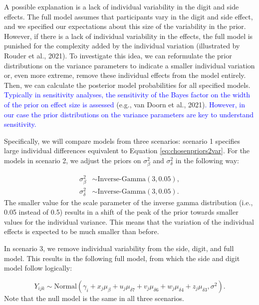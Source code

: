 \documentclass[
  english,
  doc,floatsintext]{apa6}
\begin{document}
A possible explanation is a lack of individual variability in the digit and side effects. The full model assumes that participants vary in the digit and side effect, and we specified our expectations about this size of the variability in the prior. However, if there is a lack of individual variability in the effects, the full model is punished for the complexity added by the individual variation (illustrated by Rouder et al., 2021). To investigate this idea, we can reformulate the prior distributions on the variance parameters to indicate a smaller individual variation or, even more extreme, remove these individual effects from the model entirely. Then, we can calculate the posterior model probabilities for all specified models. \textcolor{blue}{Typically in sensitivity analyses, the sensitivity of the Bayes factor on the width of the prior on effect size is assessed} (e.g., van Doorn et al., 2021)\textcolor{blue}{. However, in our case the prior distributions on the variance parameters are key to understand sensitivity.}

Specifically, we will compare models from three scenarios: scenario 1 specifies large individual differences equivalent to Equation \eqref{eq:chosenpriors2var}. For the models in scenario 2, we adjust the priors on \(\sigma^2_{\beta}\) and \(\sigma^2_{\delta}\) in the following way:

\begin{equation}
\begin{aligned}
\sigma^2_{\beta} &\sim \text{Inverse-Gamma}(3, 0.05), \\   
\sigma^2_{\delta} &\sim \text{Inverse-Gamma}(3, 0.05). 
\end{aligned}
\end{equation}
The smaller value for the scale parameter of the inverse gamma distribution (i.e., 0.05 instead of 0.5) results in a shift of the peak of the prior towards smaller values for the individual variance. This means that the variation of the individual effects is expected to be much smaller than before.

In scenario 3, we remove individual variability from the side, digit, and full model. This results in the following full model, from which the side and digit model follow logically:

\begin{equation}
Y_{ijk} \sim \text{Normal}(\gamma_{i} + x_j \mu_\beta + u_j \mu_{\delta{7}} + v_j \mu_{\delta{6}} + w_j \mu_{\delta{4}} + z_j \mu_{\delta{3}}, \sigma^2). \label{eq:datalevel2}
\end{equation}
Note that the null model is the same in all three scenarios.
\end{document}
